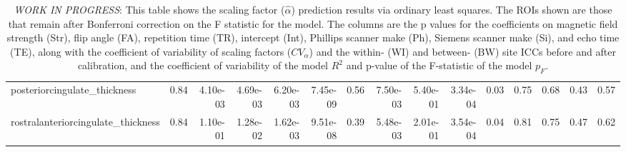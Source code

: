 \begin{table}
\begin{tabular}{lrrrrrrrrrrrrrr}
posteriorcingulate\_thickness       &  0.84 &    4.10e-03 &     4.69e-03 &  6.20e-03 &     7.45e-09 &          0.56 &      7.50e-03 &  5.40e-01 &  3.34e-04 &  0.03 &  0.75 &    0.68 &  0.43 &    0.57 \\
rostralanteriorcingulate\_thickness &  0.84 &    1.10e-01 &     1.28e-02 &  1.62e-03 &     9.51e-08 &          0.39 &      5.48e-03 &  2.01e-01 &  3.54e-04 &  0.04 &  0.81 &    0.75 &  0.47 &    0.62 \\
\bottomrule
\end{tabular}

\label{tab:alpha_predict}

\caption{\textit{WORK IN PROGRESS}: This table shows the scaling factor ($\hat{\alpha}$)  prediction results via ordinary least squares. The ROIs shown are those that remain after Bonferroni correction on the F statistic for the model. The columns are the p values for the coefficients on magnetic field strength (Str), flip angle (FA), repetition time (TR), intercept (Int), Phillips scanner make (Ph), Siemens scanner make (Si), and echo time (TE), along with the coefficient of variability of scaling factors ($CV_{\alpha}$) and the within- (WI) and between- (BW) site ICCs before and after calibration, and the coefficient of variability of the model $R^2$ and p-value of the F-statistic of the model $p_F$.}

\end{table}
